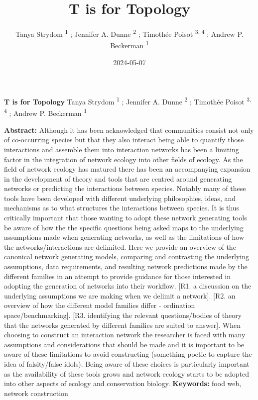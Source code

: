 \documentclass[
]{article}
\title{T is for Topology}
\author{Tanya Strydom %
%
\textsuperscript{%
%
1%
}%
; Jennifer A. Dunne %
%
\textsuperscript{%
%
2%
}%
; Timothée Poisot %
%
\textsuperscript{%
3,%
4%
}%
; Andrew P. Beckerman %
%
\textsuperscript{%
%
1%
}%
}
\date{2024-05-07}
\begin{document}
\thispagestyle{empty}
{\bfseries\sffamily\Large T is for Topology}
\vfil
Tanya Strydom %
%
\textsuperscript{%
%
1%
}%
; Jennifer A. Dunne %
%
\textsuperscript{%
%
2%
}%
; Timothée Poisot %
%
\textsuperscript{%
3,%
4%
}%
; Andrew P. Beckerman %
%
\textsuperscript{%
%
1%
}%

\vfil
{\small
\textbf{Abstract:} Although it has been acknowledged that communities
consist not only of co-occurring species but that they also interact
being able to quantify those interactions and assemble them into
interaction networks has been a limiting factor in the integration of
network ecology into other fields of ecology. As the field of network
ecology has matured there has been an accompanying expansion in the
development of theory and tools that are centred around generating
networks or predicting the interactions between species. Notably many of
these tools have been developed with different underlying philosophies,
ideas, and mechanisms as to what structures the interactions between
species. It is thus critically important that those wanting to adopt
these network generating tools be aware of how the the specific
questions being asked maps to the underlying assumptions made when
generating networks, as well as the limitations of how the
networks/interactions are delimited. Here we provide an overview of the
canonical network generating models, comparing and contrasting the
underlying assumptions, data requirements, and resulting network
predictions made by the different families in an attempt to provide
guidance for those interested in adopting the generation of networks
into their workflow. {[}R1. a discussion on the underlying assumptions
we are making when we delimit a network{]}. {[}R2. an overview of how
the different model families differ - ordination space/benchmarking{]}.
{[}R3. identifying the relevant questions/bodies of theory that the
networks generated by different families are suited to answer{]}. When
choosing to construct an interaction network the researcher is faced
with many assumptions and considerations that should be made and it is
important to be aware of these limitations to avoid constructing
(something poetic to capture the idea of falsity/false idols). Being
aware of these choices is particularly important as the availability of
these tools grows and network ecology starts to be adopted into other
aspects of ecology and conservation biology.
\vfil
\textbf{Keywords:} %
food web, %
network construction%
}
\clearpage
\setcounter{page}{1}
\doublespacing
\linenumbers
\end{document}

